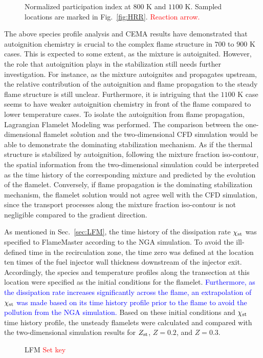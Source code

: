 \documentclass[review,3p,times]{elsarticleUS}
\begin{document}
\begin{figure}
  \centering
  \scriptsize
  
  
  \normalsize
  \caption{Normalized participation index at $800$ K and $1100$ K.  Sampled locations are marked in Fig.~\ref{fig:HRR}.  \textcolor{red}{Reaction arrow.}}
  \label{fig:CEMA}
\end{figure}



The above species profile analysis and CEMA results have demonstrated that autoignition chemistry is crucial to the complex flame structure in $700$ to $900$ K cases.  This is expected to some extent, as the mixture is autoignited.  However, the role that autoignition plays in the stabilization still needs further investigation.  For instance, as the mixture autoignites and propagates upstream, the relative contribution of the autoignition and flame propagation to the steady flame structure is still unclear.  Furthermore, it is intriguing that the $1100$ K case seems to have weaker autoignition chemistry in front of the flame compared to lower temperature cases.  To isolate the autoignition from flame propagation, Lagrangian Flamelet Modeling was performed.  The comparison between the one-dimensional flamelet solution and the two-dimensional CFD simulation would be able to demonstrate the dominating stabilization mechanism.  As if the thermal structure is stabilized by autoignition, following the mixture fraction iso-contour, the spatial information from the two-dimensional simulation could be interpreted as the time history of the corresponding mixture and predicted by the evolution of the flamelet.  Conversely, if flame propagation is the dominating stabilization mechanism, the flamelet solution would not agree well with the CFD simulation, since the transport processes along the mixture fraction iso-contour is not negligible compared to the gradient direction.

As mentioned in Sec.~\ref{sec:LFM}, the time history of the dissipation rate $\chi_{\rm st}$ was specified to FlameMaster according to the NGA simulation.  To avoid the ill-defined time in the recirculation zone, the time zero was defined at the location ten times of the fuel injector wall thickness downstream of the injector exit.  Accordingly, the species and temperature profiles along the transection at this location were specified as the initial conditions for the flamelet.  \textcolor{blue}{Furthermore, as the dissipation rate increases significantly across the flame, an extrapolation of $\chi_{\rm st}$ was made based on its time history profile prior to the flame to avoid the pollution from the NGA simulation.}  Based on these initial conditions and $\chi_{\rm st}$ time history profile, the unsteady flamelets were calculated and compared with the two-dimensional simulation results for $Z_{\rm st}$, $Z = 0.2$, and $Z = 0.3$.       
\begin{figure}
  \centering
  \scriptsize
  
%  
  \normalsize
  \vspace{0.2in}
  \caption{LFM \textcolor{red}{Set key}}
  \label{fig:LFM}
\end{figure}
\end{document}
